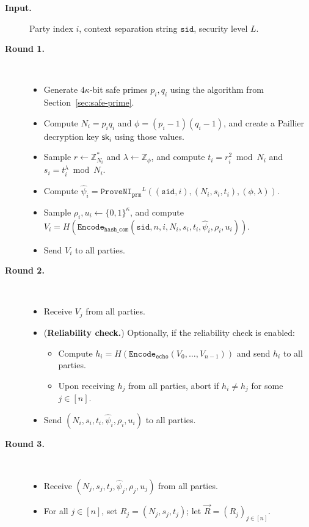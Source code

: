 \documentclass[11pt]{article}
\newcommand{\sid}{\ensuremath{\mathtt{sid}}}
\newcommand{\proveni}[1]{\ensuremath{\mathtt{ProveNI}_{\mathtt{#1}}}}
\newcommand{\Encode}[1]{\ensuremath{\mathtt{Encode}_{\mathtt{#1}}}}
\newcommand{\sk}{\textsf{sk}}
\newcommand{\Z}{\mathbb{Z}}
\newcommand{\?}[1]{\stackrel{?}{#1}}
\begin{document}
\begin{description}
  \item[\textbf{Input.}]
    Party index $i$,
    context separation string $\sid$,
    security level $L$.

  \item[\textbf{Round 1.}] \
    \begin{itemize}
    \item Generate $4\kappa$-bit safe primes $p_i, q_i$ using the algorithm from Section~\ref{sec:safe-prime}.
      \item Compute $N_i = p_iq_i$ and $\phi = (p_i - 1)(q_i - 1)$, and create a Paillier decryption key $\sk_i$ using those values.
     \item Sample  $r \gets \Z_{N_i}^{*}$ and $\lambda \gets \Z_\phi$,
        and compute $t_i = r_i^2 \bmod N_i$ and $s_i = t_i^\lambda \bmod N_i$.
      \item Compute $\hat{\psi}_i = \proveni{prm}^L((\sid, i), (N_i, s_i, t_i), (\phi, \lambda))$.
      \item Sample $\rho_i, u_i \leftarrow \{0,1\}^\kappa$, 
        and compute $V_i =
        H(\Encode{hash\_com}(\sid, n, i, N_i, s_i, t_i, \hat{\psi}_i, \rho_i, u_i))$.
      \item Send $V_i$ to all parties.
    \end{itemize}
    

  \item[\textbf{Round 2.}] \
    \begin{itemize}
      \item Receive $V_j$ from all parties.
      \item ({\bf Reliability check.}) Optionally, if the reliability check is enabled:
    \begin{itemize}
        \item 
        Compute $h_i = H(\Encode{echo}(V_0, \dots, V_{n-1}))$ and 
            send $h_i$ to all parties.
        
        
        \item Upon receiving $h_j$ from all parties, abort if $h_i \neq h_j$ for some $j \in [n]$.
    \end{itemize}
      \item Send $(N_i, s_i, t_i, \hat{\psi}_i, \rho_i, u_i)$ to all parties.
    \end{itemize}

  \item[\textbf{Round 3.}] \

    \begin{itemize}
      \item Receive $(N_j, s_j, t_j, \hat{\psi}_j, \rho_j, u_j)$
        from all parties.
      \item For all $j \in [n]$, set $R_j = (N_j, s_j, t_j)$; let
       $\vec{R} = (R_j)_{j \in [n]}$.


\end{itemize}
\end{description}
\end{document}
